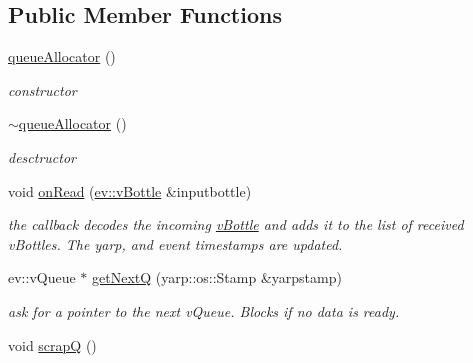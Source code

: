 \subsection*{Public Member Functions}
\begin{DoxyCompactItemize}
\item 
\hyperlink{classev_1_1queueAllocator_aecc5317205f3d9d5d753dfefcb2d3228}{queue\+Allocator} ()\hypertarget{classev_1_1queueAllocator_aecc5317205f3d9d5d753dfefcb2d3228}{}\label{classev_1_1queueAllocator_aecc5317205f3d9d5d753dfefcb2d3228}

\begin{DoxyCompactList}\small\item\em constructor \end{DoxyCompactList}\item 
\hyperlink{classev_1_1queueAllocator_a30954e25aa82ffd21aa513987a36bb40}{$\sim$queue\+Allocator} ()\hypertarget{classev_1_1queueAllocator_a30954e25aa82ffd21aa513987a36bb40}{}\label{classev_1_1queueAllocator_a30954e25aa82ffd21aa513987a36bb40}

\begin{DoxyCompactList}\small\item\em desctructor \end{DoxyCompactList}\item 
void \hyperlink{classev_1_1queueAllocator_a12ae388a8d2deb71ca5b927c3eb0a860}{on\+Read} (\hyperlink{classev_1_1vBottle}{ev\+::v\+Bottle} \&inputbottle)\hypertarget{classev_1_1queueAllocator_a12ae388a8d2deb71ca5b927c3eb0a860}{}\label{classev_1_1queueAllocator_a12ae388a8d2deb71ca5b927c3eb0a860}

\begin{DoxyCompactList}\small\item\em the callback decodes the incoming \hyperlink{classev_1_1vBottle}{v\+Bottle} and adds it to the list of received v\+Bottles. The yarp, and event timestamps are updated. \end{DoxyCompactList}\item 
ev\+::v\+Queue $\ast$ \hyperlink{classev_1_1queueAllocator_a2429870a8dd1a2e1b71853bdc7a50bde}{get\+NextQ} (yarp\+::os\+::\+Stamp \&yarpstamp)\hypertarget{classev_1_1queueAllocator_a2429870a8dd1a2e1b71853bdc7a50bde}{}\label{classev_1_1queueAllocator_a2429870a8dd1a2e1b71853bdc7a50bde}

\begin{DoxyCompactList}\small\item\em ask for a pointer to the next v\+Queue. Blocks if no data is ready. \end{DoxyCompactList}\item 
void \hyperlink{classev_1_1queueAllocator_a1a914bc39f534dc50a7eb2ba846753bf}{scrapQ} ()\hypertarget{classev_1_1queueAllocator_a1a914bc39f534dc50a7eb2ba846753bf}{}\label{classev_1_1queueAllocator_a1a914bc39f534dc50a7eb2ba846753bf}


\end{DoxyCompactItemize}
